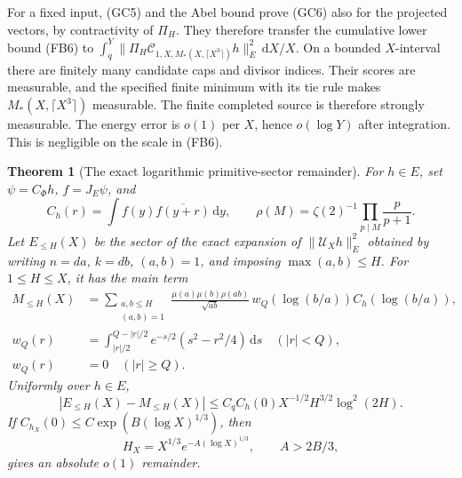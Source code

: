 \documentclass[11pt]{article}
\newtheorem{theorem}{Theorem}
\theoremstyle{remark}\newtheorem{remark}[theorem]{Remark}
\newcommand{\dd}{\,\mathrm d}
\begin{document}
For a fixed input, (GC5) and the Abel bound prove (GC6)
also for the projected vectors, by contractivity of \(\Pi_H\).
They therefore transfer the cumulative
lower bound (FB6) to
\(\int_q^Y\|\Pi_H\mathcal C_{1,X,M_*(X,\lceil X^3\rceil)}
h\|_E^2\dd X/X\). On a bounded \(X\)-interval there are
finitely many candidate caps and divisor indices. Their scores
are measurable, and the specified finite minimum with its tie
rule makes \(M_*(X,\lceil X^3\rceil)\) measurable. The finite
completed source is therefore strongly measurable.
The energy error is \(o(1)\) per \(X\), hence \(o(\log Y)\)
after integration. This is negligible on the scale in (FB6).

\begin{theorem}[The exact logarithmic primitive-sector remainder]
\label{thm:log-primitive-remainder}
For \(h\in E\), set \(\psi=C_\Phi h\),
\(f=J_E\psi\), and
\[
 C_h(r)=\int f(y)\overline{f(y+r)}\dd y,\qquad
 \rho(M)=\zeta(2)^{-1}\prod_{p\mid M}\frac p{p+1}.
\]
Let \(E_{\le H}(X)\) be the sector of the exact expansion of
\(\|\mathcal U_Xh\|_E^2\) obtained by writing \(n=d a\),
\(k=d b\), \((a,b)=1\), and imposing \(\max(a,b)\le H\).
For \(1\le H\le X\), it has the main term
\[
 \begin{split}
 M_{\le H}(X)&=
 \sum_{\substack{a,b\le H\\(a,b)=1}}
 \frac{\mu(a)\mu(b)\rho(ab)}{\sqrt{ab}}\,
                         w_Q(\log(b/a))C_h(\log(b/a)),\\
 w_Q(r)&=\int_{|r|/2}^{Q-|r|/2}
                 e^{-s/2}(s^2-r^2/4)\dd s\quad(|r|<Q),\\
 w_Q(r)&=0\quad(|r|\ge Q).
 \end{split}
 \tag{GC12}
\]
Uniformly over \(h\in E\),
\[
 |E_{\le H}(X)-M_{\le H}(X)|
 \le C_q C_h(0)X^{-1/2}H^{3/2}\log^2(2H).
 \tag{GC13}\label{eq:log-primitive-error}
\]
If \(C_{h_X}(0)\le C\exp(B(\log X)^{1/3})\), then
\[
 H_X=X^{1/3}e^{-A(\log X)^{1/3}},\qquad A>2B/3,
 \tag{GC14}
\]
gives an absolute \(o(1)\) remainder.
\end{theorem}
\end{document}
